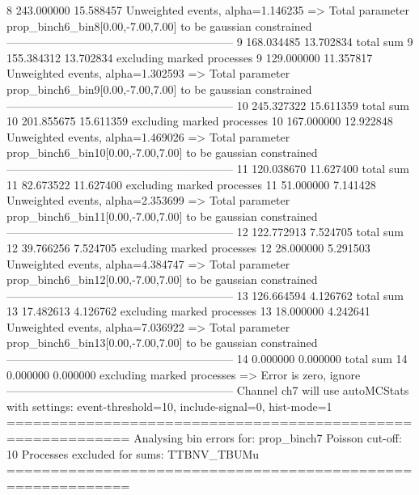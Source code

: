 8          243.000000      15.588457       Unweighted events, alpha=1.146235
  => Total parameter prop_binch6_bin8[0.00,-7.00,7.00] to be gaussian constrained
------------------------------------------------------------
9          168.034485      13.702834       total sum                     
9          155.384312      13.702834       excluding marked processes    
9          129.000000      11.357817       Unweighted events, alpha=1.302593
  => Total parameter prop_binch6_bin9[0.00,-7.00,7.00] to be gaussian constrained
------------------------------------------------------------
10         245.327322      15.611359       total sum                     
10         201.855675      15.611359       excluding marked processes    
10         167.000000      12.922848       Unweighted events, alpha=1.469026
  => Total parameter prop_binch6_bin10[0.00,-7.00,7.00] to be gaussian constrained
------------------------------------------------------------
11         120.038670      11.627400       total sum                     
11         82.673522       11.627400       excluding marked processes    
11         51.000000       7.141428        Unweighted events, alpha=2.353699
  => Total parameter prop_binch6_bin11[0.00,-7.00,7.00] to be gaussian constrained
------------------------------------------------------------
12         122.772913      7.524705        total sum                     
12         39.766256       7.524705        excluding marked processes    
12         28.000000       5.291503        Unweighted events, alpha=4.384747
  => Total parameter prop_binch6_bin12[0.00,-7.00,7.00] to be gaussian constrained
------------------------------------------------------------
13         126.664594      4.126762        total sum                     
13         17.482613       4.126762        excluding marked processes    
13         18.000000       4.242641        Unweighted events, alpha=7.036922
  => Total parameter prop_binch6_bin13[0.00,-7.00,7.00] to be gaussian constrained
------------------------------------------------------------
14         0.000000        0.000000        total sum                     
14         0.000000        0.000000        excluding marked processes    
  => Error is zero, ignore      
------------------------------------------------------------
Channel ch7 will use autoMCStats with settings: event-threshold=10, include-signal=0, hist-mode=1
============================================================
Analysing bin errors for: prop_binch7
Poisson cut-off: 10
Processes excluded for sums: TTBNV_TBUMu
============================================================
